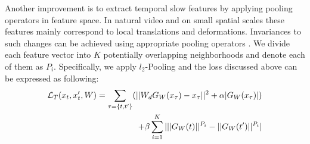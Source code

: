 Another improvement is to extract temporal slow features by applying pooling operators in feature space. 
In natural video and on small spatial scales these features mainly correspond to local translations and deformations. 
Invariances to such changes can be achieved using appropriate pooling operators \cite{sifre2013rotation}.
We divide each feature vector into $K$ potentially overlapping neighborhoods and denote each of them as $P_i$. 
Specifically, we apply $l_2$-Pooling and the loss discussed above can be expressed as following:
\begin{equation}
\begin{split}
\lagr_T(x_t, x_t\rq{}, W) = \sum_{\tau = \{t, t\rq{}\}} (||W_d G_W(x_\tau) - x_\tau||^2 + \alpha |G_W(x_\tau)|) \\
+ \beta \sum_{i=1}^K |||G_W(t)||^{P_i} -  ||G_W(t\rq{})||^{P_i}|
\end{split}
\end{equation}
